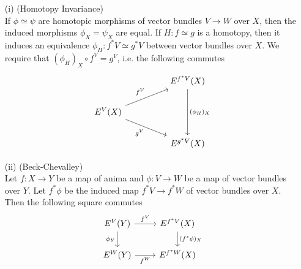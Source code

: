 \begin{definition}
  \begin{enumerate}
    \item[(i)]\label{homotopyinvariance} (Homotopy Invariance)\\
     If $\phi \simeq \psi$ are homotopic morphisms of vector bundles $V \to W$ over $X$, then 
     the induced morphisms $\phi_X = \psi_X$ are equal.
     If $H \colon f \simeq g$ is a homotopy, then it induces an equivalence 
     $\phi_H \colon f^*V \simeq g^*V$ between vector bundles over $X$.
     We require that $({\phi_H})_X \circ f^V = g^V$, i.e. the following commutes 
     \[\begin{tikzcd}
      && {E^{f^*V}(X)} \\
      {E^V(X)} \\
      && {E^{g^*V}(X)}
      \arrow["{({\phi_H})_X}", from=1-3, to=3-3]
      \arrow["{f^V}", from=2-1, to=1-3]
      \arrow["{g^V}"', from=2-1, to=3-3]
    \end{tikzcd}\]
    \iffalse
    \item[(ii)]\label{additivity} (Additivity)\\
    For each collection $(X_i,V_i)_{i \in I}$
    of anima $X_i$ and vector bundles $V_i$ over $X_i$ the induced homomorphism
    \[
      E^{\coprod_i V_i}(\coprod_i X_i) \to \prod_i E^{V_i}(X_i)
      \]
      is an isomorphism.
    \fi 
      \item[(ii)]\label{beckchavalley} (Beck-Chevalley)\\
      Let $f \colon X \to Y$ be
      a map of anima and $\phi \colon V \to W$ be a map of vector bundles over $Y$.
      Let $f^*\phi$ be the induced map $f^* V \to f^* W$ of vector bundles over $X$.
      Then the following square commutes
      \[\begin{tikzcd}
        {E^{V}(Y)} & {E^{f^*V}(X)} \\
        {E^W(Y)} & {E^{f^*W}(X)}
        \arrow["{\phi_Y}"', from=1-1, to=2-1]
        \arrow["{f^W}"', from=2-1, to=2-2]
        \arrow["{f^V}", from=1-1, to=1-2]
        \arrow["{(f^*\phi)_X}", from=1-2, to=2-2]
      \end{tikzcd}\]
  

\end{enumerate}
\end{definition}
